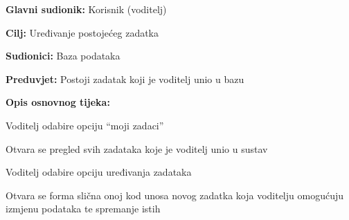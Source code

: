					\noindent {}
					\begin{packed_item}
						
						\item \textbf{Glavni sudionik: }Korisnik (voditelj)
						\item \textbf{Cilj:} Uređivanje postojećeg zadatka
						\item \textbf{Sudionici:} Baza podataka
						\item \textbf{Preduvjet:} Postoji zadatak koji je voditelj unio u bazu
						\item \textbf{Opis osnovnog tijeka:}
						
						\item[] \begin{packed_enum}
							\item Voditelj odabire opciju “moji zadaci”
							\item Otvara se pregled svih zadataka koje je voditelj unio u sustav
							\item Voditelj odabire opciju uređivanja zadataka
							\item Otvara se forma slična onoj kod unosa novog zadatka koja voditelju omogućuju izmjenu podataka te spremanje istih
						\end{packed_enum}
					\end{packed_item}
					
					
					

